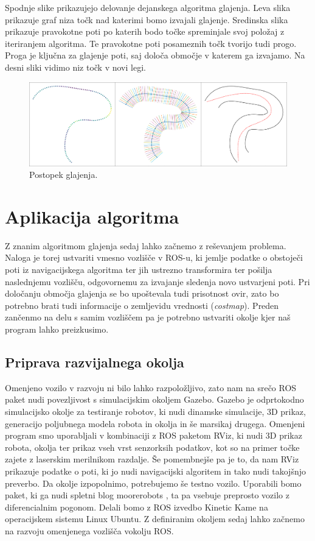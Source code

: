 \documentclass[10pt,a4paper]{article}
\begin{document}
Spodnje slike prikazujejo delovanje dejanskega algoritma glajenja. Leva slika prikazuje graf niza točk nad katerimi bomo  izvajali glajenje. Sredinska slika prikazuje pravokotne poti po katerih bodo točke spreminjale svoj položaj z iteriranjem algoritma. Te pravokotne poti posameznih točk tvorijo tudi progo. Proga je ključna za glajenje poti, saj določa območje v katerem ga izvajamo. Na desni sliki vidimo niz točk v novi legi.

\begin{figure}[H]
	\centering
	\includegraphics[width=15cm]{pic/slika6.png}
	\caption{Postopek glajenja.}
	\label{fig:slika}
\end{figure}

\section{Aplikacija algoritma}

Z znanim algoritmom glajenja sedaj lahko začnemo z reševanjem problema. Naloga je torej ustvariti vmesno vozlišče v ROS-u, ki jemlje podatke o obstoječi poti iz navigacijskega algoritma ter jih ustrezno transformira ter pošilja naslednjemu vozlišču, odgovornemu za izvajanje sledenja novo ustvarjeni poti. Pri določanju območja glajenja se bo upoštevala tudi prisotnost ovir, zato bo potrebno brati tudi informacije o zemljevidu vrednosti (\textit{costmap}). Preden zančenmo na delu s samim vozliščem pa je potrebno ustvariti okolje kjer naš program lahko preizkusimo.

\subsection{Priprava razvijalnega okolja}

Omenjeno vozilo v razvoju ni bilo lahko razpoložljivo, zato nam na srečo ROS paket nudi povezljivost s simulacijskim okoljem Gazebo. Gazebo je odprtokodno simulacijsko okolje za testiranje robotov, ki nudi dinamske simulacije, 3D prikaz, generacijo poljubnega modela robota in okolja in še marsikaj drugega. Omenjeni program smo uporabljali v kombinaciji z ROS paketom RViz, ki nudi 3D prikaz robota, okolja ter prikaz vseh vrst senzorksih podatkov, kot so na primer točke zajete z laserskim merilnikom razdalje. Še pomembnejše pa je to, da nam RViz prikazuje podatke o poti, ki jo nudi navigacijski algoritem in tako nudi takojšnjo preverbo. Da okolje izpopolnimo, potrebujemo še testno vozilo. Uporabili bomo paket, ki ga nudi spletni blog moorerobots \cite{moorerobots}, ta pa vsebuje preprosto vozilo z diferencialnim pogonom. Delali bomo z ROS izvedbo Kinetic Kame na operacijskem sistemu Linux Ubuntu. Z definiranim okoljem sedaj lahko začnemo na razvoju omenjenega vozlišča vokolju ROS.
\end{document}
